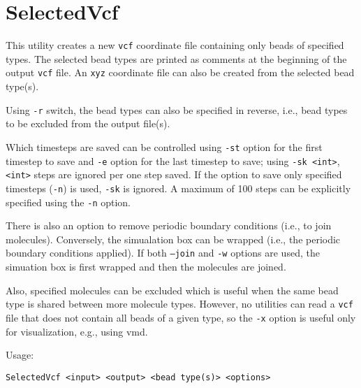 \section{SelectedVcf} \label{sec:SelectedVcf}

This utility creates a new \texttt{vcf} coordinate file containing only
beads of specified types. The selected bead
types are printed as comments at the beginning of the output \texttt{vcf}
file.
An \texttt{xyz} coordinate file can also be created from the selected
bead type(s).

Using \texttt{-r} switch, the bead types can also be specified in reverse,
i.e., bead types to be excluded from the output file(s).

Which timesteps are saved can be controlled using \texttt{-st} option for
the first timestep to save and \texttt{-e} option for the last timestep to
save; using \texttt{-sk <int>}, \texttt{<int>} steps are ignored per one
step saved. If the option to save only specified timesteps (\texttt{-n}) is
used, \texttt{-sk} is ignored. A maximum of 100 steps can be explicitly
specified using the \texttt{-n} option.

There is also an option to remove periodic boundary conditions (i.e., to join
molecules). Conversely, the simualation box can be wrapped (i.e., the
periodic boundary conditions applied). If both \texttt{--join} and
\texttt{-w} options are used, the simuation box is first wrapped and then
the molecules are joined.

Also, specified molecules can be excluded which is useful when the same
bead type is shared between more molecule types. However, no utilities can
read a \texttt{vcf} file that does not contain all beads of a given type,
so the \texttt{-x} option is useful only for visualization, e.g., using
vmd.

Usage:

\vspace{1em}
\noindent
\texttt{SelectedVcf <input> <output> <bead type(s)> <options>}

